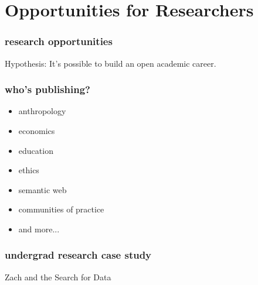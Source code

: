 \section{Opportunities for Researchers}
\begin{comment}
Researchers: they exist! (10 seconds each, no more.)
* coleman - ethics in foss communities
* krafft - innovation diffusion
* benkler - "law stuff"
* von hippel - economics
* lawler - wikiversity formation
* dennys and martin - semantic mediawiki
* davis and jabeen - legitimate peripheral participation
* government adoption paper whose author name I forgot
* Mini Case Study: CC licensed video in Zach's research
\end{comment}



\begin{frame} 
\frametitle{research opportunities}
\huge
\begin{center}
\alert{Hypothesis:} It's possible to build
an open academic career.
\end{center}
\end{frame} 



\begin{frame} 
\frametitle{who's publishing?}
\begin{itemize}
	\item anthropology %
	\item economics %
	\item education %
	\item ethics %
	\item semantic web %
	\item communities of practice %
	\item and more...
\end{itemize}

\end{frame} 



\begin{frame} 
\frametitle{undergrad research case study}
\huge
\begin{center}
Zach and the Search for Data %
\end{center}
\end{frame} 

